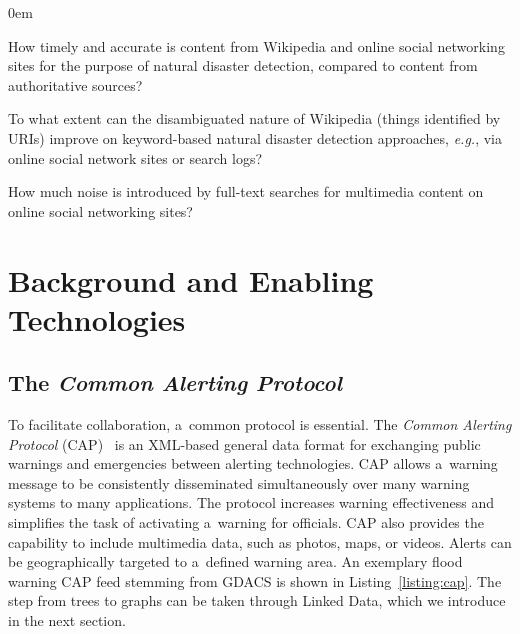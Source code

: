 \documentclass[letterpaper]{article}
\begin{document}
\begin{description}
  \itemsep0em
  \item[$\mathbb{Q}1$] How timely and accurate is content from Wikipedia
    and online social networking sites
    for the purpose of natural disaster detection,
    compared to content from authoritative sources?
  \item[$\mathbb{Q}2$] To what extent can the disambiguated nature of Wikipedia
    (things identified by URIs) improve on keyword-based natural disaster detection approaches,
    \emph{e.g.}, via online social network sites or search logs?
  \item[$\mathbb{Q}3$] How much noise is introduced by full-text searches
    for multimedia content on online social networking sites? 
\end{description}

\section{Background and Enabling Technologies}

\subsection{The \emph{Common Alerting Protocol}}
To facilitate collaboration, a~common protocol is essential.
The \emph{Common Alerting Protocol} (CAP)~\cite{westfall2010cap}
is an XML-based general data format for exchanging public warnings
and emergencies between alerting technologies.
CAP allows a~warning message to be consistently disseminated simultaneously
over many warning systems to many applications.
The protocol increases warning effectiveness and
simplifies the task of activating a~warning for officials.
CAP also provides the capability to include multimedia data,
such as photos, maps, or videos.
Alerts can be geographically targeted to a~defined warning area.
An exemplary flood warning CAP feed stemming from GDACS is shown in
Listing~\ref{listing:cap}.
The step from trees to graphs can be taken through Linked Data,
which we introduce in the next section.
\end{document}
